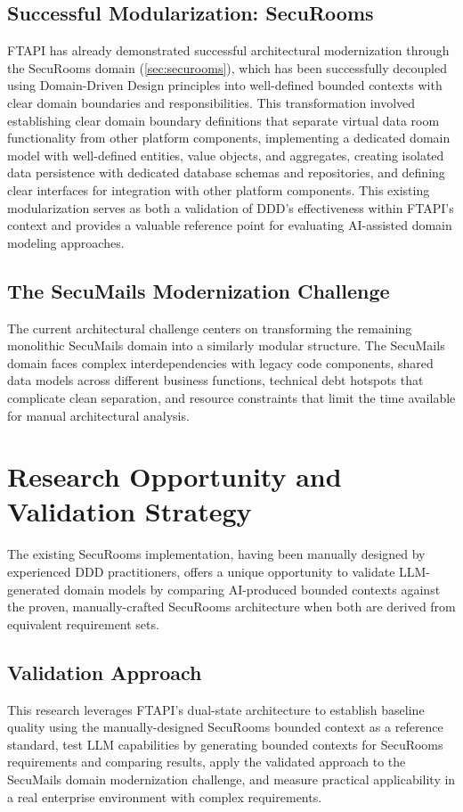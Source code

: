 \subsection{Successful Modularization: SecuRooms}
FTAPI has already demonstrated successful architectural modernization through the SecuRooms domain (\autoref{sec:securooms}), which has been successfully decoupled using Domain-Driven Design principles into well-defined bounded contexts with clear domain boundaries and responsibilities. This transformation involved establishing clear domain boundary definitions that separate virtual data room functionality from other platform components, implementing a dedicated domain model with well-defined entities, value objects, and aggregates, creating isolated data persistence with dedicated database schemas and repositories, and defining clear interfaces for integration with other platform components.
This existing modularization serves as both a validation of DDD's effectiveness within FTAPI's context and provides a valuable reference point for evaluating AI-assisted domain modeling approaches.

\subsection{The SecuMails Modernization Challenge}
The current architectural challenge centers on transforming the remaining monolithic SecuMails domain into a similarly modular structure. The SecuMails domain faces complex interdependencies with legacy code components, shared data models across different business functions, technical debt hotspots that complicate clean separation, and resource constraints that limit the time available for manual architectural analysis.

\section{Research Opportunity and Validation Strategy}
The existing SecuRooms implementation, having been manually designed by experienced DDD practitioners, offers a unique opportunity to validate LLM-generated domain models by comparing AI-produced bounded contexts against the proven, manually-crafted SecuRooms architecture when both are derived from equivalent requirement sets.

\subsection{Validation Approach}
This research leverages FTAPI's dual-state architecture to establish baseline quality using the manually-designed SecuRooms bounded context as a reference standard, test LLM capabilities by generating bounded contexts for SecuRooms requirements and comparing results, apply the validated approach to the SecuMails domain modernization challenge, and measure practical applicability in a real enterprise environment with complex requirements.

